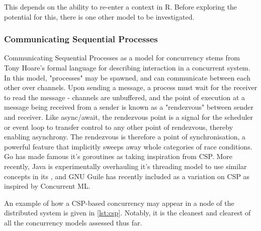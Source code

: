 This depends on the ability to re-enter a context in R.
Before exploring the potential for this, there is one other model to be investigated.

\subsubsection{Communicating Sequential Processes}

Communicating Sequential Processes as a model for concurrency stems from Tony Hoare's formal language for describing interaction in a concurrent system\cite{hoare1978communicating}.
In this model, "processes" may be spawned, and can communicate between each other over channels.
Upon sending a message, a process must wait for the receiver to read the message - channels are unbuffered, and the point of execution at a message being received from a sender is known as a "rendezvous" between sender and receiver.
Like async/await, the rendezvous point is a signal for the scheduler or event loop to transfer control to any other point of rendezvous, thereby enabling asynchrony.
The rendezvous is therefore a point of synchronisation, a powerful feature that implicitly sweeps away whole categories of race conditions.
Go has made famous it's goroutines as taking inspiration from CSP\cite{gomem2014}.
More recently, Java is experimentally overhauling it's threading model to use similar concepts in its , and GNU Guile has recently included  as a variation on CSP as inspired by Concurrent ML.

An example of how a CSP-based concurrency may appear in a node of the distributed system is given in \ref{lst:csp}.
Notably, it is the cleanest and clearest of all the concurrency models assessed thus far.

